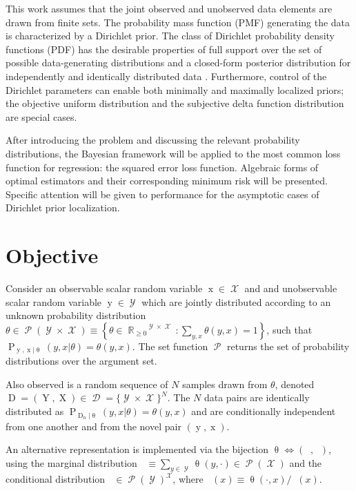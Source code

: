 \documentclass{article}
\DeclareMathOperator{\xrm}{\mathrm{x}}
\DeclareMathOperator{\Xrm}{\mathrm{X}}
\DeclareMathOperator{\yrm}{\mathrm{y}}
\DeclareMathOperator{\Yrm}{\mathrm{Y}}
\DeclareMathOperator{\Drm}{\mathrm{D}}
\DeclareMathOperator{\Prm}{\mathrm{P}}
\DeclareMathOperator{\Xcal}{\mathcal{X}}
\DeclareMathOperator{\Ycal}{\mathcal{Y}}
\DeclareMathOperator{\Dcal}{\mathcal{D}}
\DeclareMathOperator{\Pcal}{\mathcal{P}}
\DeclareMathOperator{\Rbb}{\mathbb{R}}
\DeclareMathOperator{\upthetam}{\uptheta_\text{m}}
\DeclareMathOperator{\upthetac}{\uptheta_\text{c}}
\begin{document}
This work assumes that the joint observed and unobserved data elements are drawn from finite sets. The probability mass function (PMF) generating the data is characterized by a Dirichlet prior. The class of Dirichlet probability density functions (PDF) has the desirable properties of full support over the set of possible data-generating distributions and a closed-form posterior distribution for independently and identically distributed data \cite{ferguson}. Furthermore, control of the Dirichlet parameters can enable both minimally and maximally localized priors; the objective uniform distribution and the subjective delta function distribution are special cases. 

After introducing the problem and discussing the relevant probability distributions, the Bayesian framework will be applied to the most common loss function for regression: the squared error loss function. Algebraic forms of optimal estimators and their corresponding minimum risk will be presented. Specific attention will be given to performance for the asymptotic cases of Dirichlet prior localization.




\section{Objective}

Consider an observable scalar random variable $\xrm \in \Xcal$ and and unobservable scalar random variable $\yrm \in \Ycal$ which are jointly distributed according to an unknown probability distribution $\theta \in \Pcal(\Ycal \times \Xcal) \equiv \left\{ \theta \in {\Rbb_{\geq 0}}^{\Ycal \times \Xcal}: \sum_{y,x} \theta(y,x) = 1 \right\}$, such that $\Prm_{\yrm,\xrm | \uptheta}(y,x | \theta) = \theta(y,x)$. The set function $\Pcal$ returns the set of probability distributions over the argument set.

Also observed is a random sequence of $N$ samples drawn from $\theta$, denoted $\Drm = ( \Yrm,\Xrm ) \in \Dcal = \{\Ycal \times \Xcal\}^N$. The $N$ data pairs are identically distributed as $\Prm_{\Drm_n | \uptheta}(y,x | \theta) = \theta(y,x)$ and are conditionally independent from one another and from the novel pair $(\yrm,\xrm)$.


An alternative representation is implemented via the bijection $\uptheta \Leftrightarrow (\upthetam,\upthetac)$, using the marginal distribution $\upthetam \equiv \sum_{y \in \Ycal} \uptheta(y,\cdot) \in \Pcal(\Xcal)$ and the conditional distribution $\upthetac \in \Pcal(\Ycal)^{\Xcal}$, where $\upthetac(x) \equiv \uptheta(\cdot,x) / \upthetam(x)$. 
\end{document}

